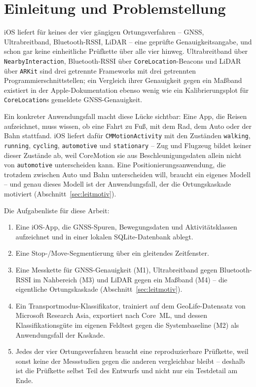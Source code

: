 \documentclass[11pt,a4paper,oneside]{article}
\begin{document}
\newpage
\tableofcontents
\newpage

\section{Einleitung und Problemstellung}

iOS liefert für keines der vier gängigen Ortungsverfahren -- GNSS,
Ultrabreitband, Bluetooth-RSSI, LiDAR -- eine geprüfte Genauigkeitsangabe,
und schon gar keine einheitliche Prüfkette über alle vier hinweg.
Ultrabreitband über \texttt{NearbyInteraction}, Bluetooth-RSSI über
\texttt{CoreLocation}-Beacons und LiDAR über \texttt{ARKit} sind drei
getrennte Frameworks mit drei getrennten Programmierschnittstellen; ein
Vergleich ihrer Genauigkeit gegen ein Maßband existiert in der
Apple-Dokumentation ebenso wenig wie ein Kalibrierungsplot für
\texttt{CoreLocation}s gemeldete GNSS-Genauigkeit.

Ein konkreter Anwendungsfall macht diese Lücke sichtbar: Eine App, die
Reisen aufzeichnet, muss wissen, ob eine Fahrt zu Fuß, mit dem Rad, dem
Auto oder der Bahn stattfand. iOS liefert dafür \texttt{CMMotionActivity}
mit den Zuständen \texttt{walking}, \texttt{running}, \texttt{cycling},
\texttt{automotive} und \texttt{stationary} -- Zug und Flugzeug bildet
keiner dieser Zustände ab, weil CoreMotion sie aus Beschleunigungsdaten
allein nicht von \texttt{automotive} unterscheiden kann. Eine
Positionierungsanwendung, die trotzdem zwischen Auto und Bahn
unterscheiden will, braucht ein eigenes Modell -- und genau dieses Modell
ist der Anwendungsfall, der die Ortungskaskade motiviert
(Abschnitt~\ref{sec:leitmotiv}).

Die Aufgabenliste für diese Arbeit:

\begin{enumerate}
    \item Eine iOS-App, die GNSS-Spuren, Bewegungsdaten und Aktivitätsklassen
    aufzeichnet und in einer lokalen SQLite-Datenbank ablegt.
    \item Eine Stop-/Move-Segmentierung über ein gleitendes Zeitfenster.
    \item Eine Messkette für GNSS-Genauigkeit (M1), Ultrabreitband gegen
    Bluetooth-RSSI im Nahbereich (M3) und LiDAR gegen ein Maßband (M4) --
    die eigentliche Ortungskaskade (Abschnitt~\ref{sec:leitmotiv}).
    \item Ein Transportmodus-Klassifikator, trainiert auf dem
    GeoLife-Datensatz von Microsoft Research Asia, exportiert nach Core~ML,
    und dessen Klassifikationsgüte im eigenen Feldtest gegen die
    Systembaseline (M2) als Anwendungsfall der Kaskade.
    \item Jedes der vier Ortungsverfahren braucht eine reproduzierbare
    Prüfkette, weil sonst keine der Messstudien gegen die anderen
    vergleichbar bleibt -- deshalb ist die Prüfkette selbst Teil des
    Entwurfs und nicht nur ein Testdetail am Ende.
\end{enumerate}
\end{document}
